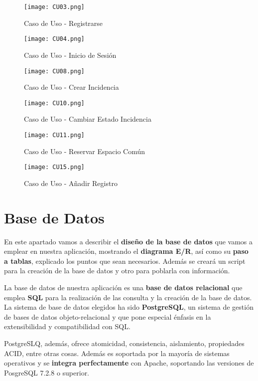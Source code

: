 \begin{figure}[H]
	\centering
	\texttt{[image: CU03.png]}
	\caption{Caso de Uso - Registrarse}
\end{figure}

\begin{figure}[H]
	\centering
	\texttt{[image: CU04.png]}
	\caption{Caso de Uso - Inicio de Sesión}
\end{figure}

\begin{figure}[H]
	\centering
	\texttt{[image: CU08.png]}
	\caption{Caso de Uso - Crear Incidencia}
\end{figure}

\begin{figure}[H]
	\centering
	\texttt{[image: CU10.png]}
	\caption{Caso de Uso - Cambiar Estado Incidencia}
\end{figure}

\begin{figure}[H]
	\centering
	\texttt{[image: CU11.png]}
	\caption{Caso de Uso - Reservar Espacio Común}
\end{figure}

\begin{figure}[H]
	\centering
	\texttt{[image: CU15.png]}
	\caption{Caso de Uso - Añadir Registro}
\end{figure}


\section{Base de Datos}
En este apartado vamos a describir el \textbf{diseño de la base de datos} que vamos a emplear en nuestra aplicación, mostrando el \textbf{diagrama E/R}, así como su \textbf{paso a tablas}, explicado los puntos que sean necesarios. Además se creará un script para la creación de la base de datos y otro para poblarla con información.

La base de datos de nuestra aplicación es una \textbf{base de datos relacional} que emplea \textbf{SQL} para la realización de las consulta y la creación de la base de datos. La sistema de base de datos elegidos ha sido \textbf{PostgreSQL}, un sistema de gestión de bases de datos objeto-relacional y que pone especial énfasis en la extensibilidad y compatibilidad con SQL. \cite{wiki02}

PostgreSLQ, además, ofrece atomicidad, consistencia, aislamiento, propiedades \gls{ACID}, entre otras cosas. Además es soportada por la mayoría de sistemas operativos y se \textbf{integra perfectamente} con Apache, soportando las versiones de PosgreSQL 7.2.8 o superior. \cite{apache01}

